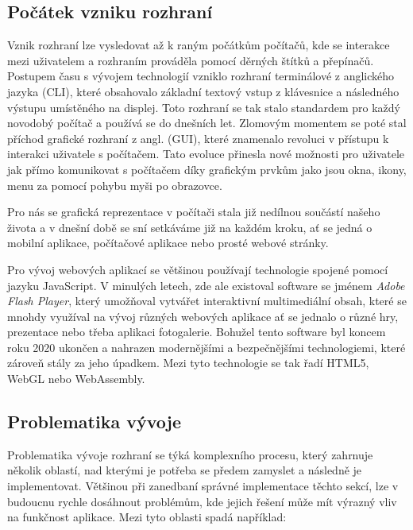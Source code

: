\subsection{Počátek vzniku rozhraní}
\label{subsec:ui-gui-theory-beginning}
Vznik rozhraní lze vysledovat až k raným počátkům počítačů, kde se interakce mezi uživatelem a rozhraním prováděla pomocí děrných štítků a přepínačů. Postupem času s vývojem technologií vzniklo rozhraní terminálové z anglického jazyka \textit{} (CLI), které obsahovalo základní textový vstup z klávesnice a následného výstupu umístěného na displej. Toto rozhraní se tak stalo standardem pro každý novodobý počítač a používá se do dnešních let. Zlomovým momentem se poté stal příchod grafické rozhraní z angl. \textit{} (GUI), které znamenalo revoluci v přístupu k interakci uživatele s počítačem. Tato evoluce přinesla nové možnosti pro uživatele jak přímo komunikovat s počítačem díky grafickým prvkům jako jsou okna, ikony, menu za pomocí pohybu myši po obrazovce.

Pro nás se grafická reprezentace v počítači stala již nedílnou součástí našeho života a v dnešní době se sní setkáváme již na každém kroku, ať se jedná o mobilní aplikace, počítačové aplikace nebo prosté webové stránky.

Pro vývoj webových aplikací se většinou používají technologie spojené pomocí jazyku JavaScript. V minulých letech, zde ale existoval software se jménem \textit{Adobe Flash Player}, který umožňoval vytvářet interaktivní multimediální obsah, které se mnohdy využíval na vývoj různých webových aplikace ať se jednalo o různé hry, prezentace nebo třeba aplikaci fotogalerie. Bohužel tento software byl koncem roku 2020 ukončen a nahrazen modernějšími a bezpečnějšími technologiemi, které zároveň stály za jeho úpadkem. Mezi tyto technologie se tak řadí HTML5, WebGL nebo WebAssembly. \cite{adobeFlashPlayer-eol}

\subsection{Problematika vývoje}
\label{subsec:ui-gui-theory-problems}
Problematika vývoje rozhraní se týká komplexního procesu, který zahrnuje několik oblastí, nad kterými je potřeba se předem zamyslet a následně je implementovat. Většinou při zanedbaní správné implementace těchto sekcí, lze v budoucnu rychle dosáhnout problémům, kde jejich řešení může mít výrazný vliv na funkčnost aplikace. Mezi tyto oblasti spadá například:

